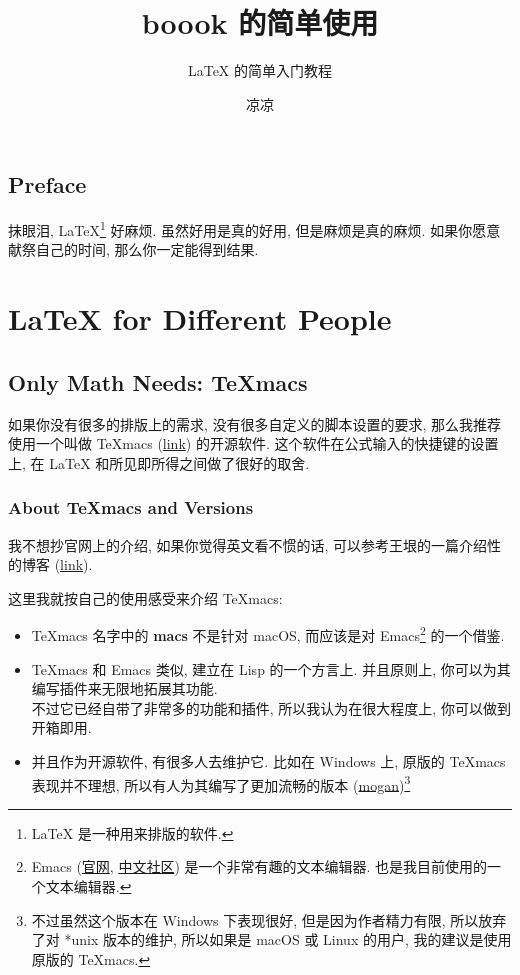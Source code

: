 \documentclass[geomode=digital, code=minted]{boook}
\title{boook 的简单使用}
\subtitle{\LaTeX{} 的简单入门教程}
\author{凉凉}
\begin{document}
\maketitle
\frontmatter
\chapter*{Preface}
抹眼泪, \LaTeX{}\footnote{
  \LaTeX{} 是一种用来排版的软件. 
} 好麻烦. 虽然好用是真的好用, 但是麻烦是真的麻烦. 
如果你愿意献祭自己的时间, 那么你一定能得到结果. 

\tableofcontents
\mainmatter

\part{\LaTeX{} for Different People}
\chapter{Only Math Needs: TeXmacs}
如果你没有很多的排版上的需求, 没有很多自定义的脚本设置的要求,
那么我推荐使用一个叫做 TeXmacs (\href{https://www.texmacs.org}{link})
的开源软件. 这个软件在公式输入的快捷键的设置上, 在 \LaTeX{}
和所见即所得之间做了很好的取舍. 

\section{About TeXmacs and Versions}
我不想抄官网上的介绍, 如果你觉得英文看不惯的话,
可以参考王垠的一篇介绍性的博客
(\href{http://www.yinwang.org/blog-cn/2012/09/18/texmacs}{link}).

这里我就按自己的使用感受来介绍 TeXmacs:

\begin{itemize}
\item TeXmacs 名字中的 \textbf{macs} 不是针对 macOS,
  而应该是对 Emacs\footnote{
    Emacs (\href{https://www.gnu.org/software/emacs/}{官网},
    \href{https://www.gnu.org/software/emacs/}{中文社区})
    是一个非常有趣的文本编辑器. 也是我目前使用的一个文本编辑器. }
  的一个借鉴.
\item TeXmacs 和 Emacs 类似, 建立在 Lisp 的一个方言上.
  并且原则上, 你可以为其编写插件来无限地拓展其功能. \\
  不过它已经自带了非常多的功能和插件, 所以我认为在很大程度上,
  你可以做到开箱即用. 
\item 并且作为开源软件, 有很多人去维护它. 比如在 Windows 上,
  原版的 TeXmacs 表现并不理想, 所以有人为其编写了更加流畅的版本
  (\href{https://gitee.com/XmacsLabs/mogan}{mogan})\footnote{
    不过虽然这个版本在 Windows 下表现很好, 但是因为作者精力有限,
    所以放弃了对 *unix 版本的维护, 所以如果是 macOS 或 Linux 的用户,
    我的建议是使用原版的 TeXmacs. 
  }
\end{itemize}
\end{document}
